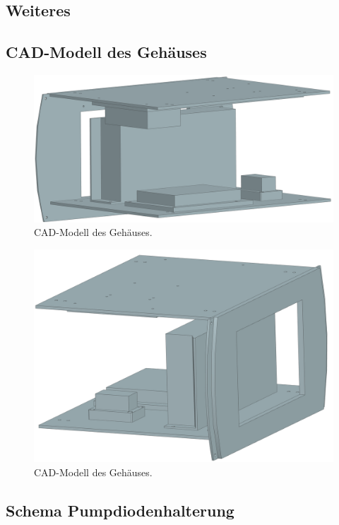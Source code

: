 \begin{appendix}
{{\section{Weiteres}
\subsection{CAD-Modell des Gehäuses}
\label{chptr:_cad_gehäuse}

\begin{figure}[H]
    \centering
    \includegraphics[scale=0.55]{98_images/assembly_controller_a_01.PNG}
    \caption{CAD-Modell des Gehäuses.}
    \label{fig:cad_modell_01}
\end{figure}

\begin{figure}[H]
    \centering
    \includegraphics[scale=0.55]{98_images/assembly_controller_a_02.PNG}
    \caption{CAD-Modell des Gehäuses.}
    \label{fig:cad_modell_02}
\end{figure}

\subsection{Schema Pumpdiodenhalterung}
\label{chptr:_pumpdiodenhalterung}

}}
\end{appendix}

